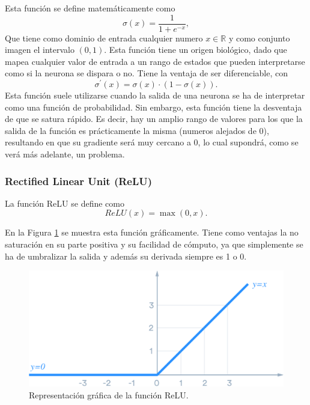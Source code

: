 \documentclass[spanish,a4paper, 11pt]{article}
\numberwithin{equation}{section}
\numberwithin{table}{section}
\numberwithin{figure}{section}
\begin{document}
Esta función se define matemáticamente como
\begin{equation}
\sigma(x) = \frac{1}{1+e^{-x}},
\end{equation}
Que tiene como dominio de entrada cualquier numero $x \in \mathbb{R}$ y como conjunto imagen el intervalo $(0,1)$. Esta función tiene un origen biológico, dado que mapea cualquier valor de entrada a un rango de estados que pueden interpretarse como si la neurona se dispara o no. Tiene la ventaja de ser diferenciable, con 
\begin{equation}
\sigma^\prime(x) = \sigma(x)  \cdot \left(1- \sigma(x) \right) .
\end{equation}
Esta función suele utilizarse cuando la salida de una neurona se ha de interpretar como una función de probabilidad. Sin embargo, esta función tiene la desventaja de que se satura rápido. Es decir, hay un amplio rango de valores para los que la salida de la función es prácticamente la misma (numeros alejados de 0), resultando en que su gradiente será muy cercano a 0, lo cual supondrá, como se verá más adelante, un problema.

\subsubsection{Rectified Linear Unit (ReLU)}

La función ReLU se define como
\begin{equation}
ReLU(x) = \max{(0,x)}.
\end{equation}

En la Figura \ref{ReLU} se muestra esta función gráficamente. Tiene como ventajas la no saturación en su parte positiva y su facilidad de cómputo, ya que simplemente se ha de umbralizar la salida y además su derivada siempre es 1 o 0.

\begin{figure}[H]
	\centering
	\includegraphics[width=0.7\linewidth]{ReLU.png}
	\caption{Representación gráfica de la función ReLU.}
	\label{ReLU}	
\end{figure}
\end{document}

